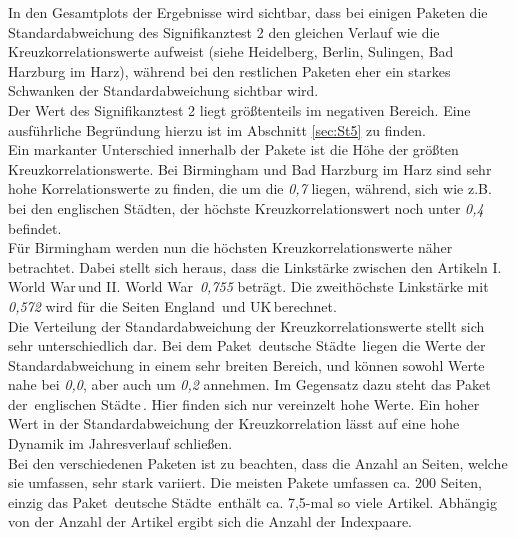 \documentclass[fontsize=11pt, twoside, a4paper]{scrartcl}
\begin{document}
In den Gesamtplots der Ergebnisse wird sichtbar, dass bei einigen Paketen die Standardabweichung des Signifikanztest 2 den gleichen Verlauf wie die Kreuzkorrelationswerte aufweist (siehe Heidelberg, Berlin, Sulingen, Bad Harzburg im Harz), während bei den restlichen Paketen eher ein starkes Schwanken der Standardabweichung sichtbar wird.\\
Der Wert des Signifikanztest 2 liegt größtenteils im negativen Bereich. Eine ausführliche Begründung
hierzu ist im Abschnitt \ref{sec:St5} zu finden.\\
Ein markanter Unterschied innerhalb der Pakete ist die Höhe der größten Kreuzkorrelationswerte. Bei Birmingham und Bad Harzburg im Harz sind sehr hohe Korrelationswerte zu finden, die um die \textit{0,7} liegen, während, sich wie z.B. bei den englischen Städten, der höchste Kreuzkorrelationswert noch unter \textit{0,4} befindet.\\
Für Birmingham werden nun die höchsten Kreuzkorrelationswerte näher betrachtet. Dabei stellt sich heraus, dass die Linkstärke zwischen den Artikeln \glqq I. World War\grqq \,und \glqq II. World War\grqq \, \textit{0,755} beträgt. Die zweithöchste Linkstärke mit \textit{0,572} wird für die Seiten \glqq England\grqq\, und \glqq UK\grqq \,berechnet.\\
Die Verteilung der Standardabweichung der Kreuzkorrelationswerte stellt sich sehr unterschiedlich dar. Bei dem Paket \,\glqq deutsche Städte\grqq\, liegen die Werte der Standardabweichung in einem sehr breiten Bereich, und können sowohl Werte nahe bei \textit{0,0}, aber auch um \textit{0,2} annehmen. Im Gegensatz dazu steht das Paket der \,\glqq englischen Städte\grqq\,. Hier finden sich nur vereinzelt hohe Werte. Ein hoher Wert in der Standardabweichung der Kreuzkorrelation lässt auf eine hohe Dynamik im Jahresverlauf schließen.\\
Bei den verschiedenen Paketen ist zu beachten, dass die Anzahl an Seiten, welche sie umfassen, sehr stark variiert. Die meisten Pakete umfassen ca. 200 Seiten, einzig das Paket \,\glqq deutsche Städte\grqq\, enthält ca. 7,5-mal so viele Artikel. 
Abhängig von der Anzahl der Artikel ergibt sich die Anzahl der Indexpaare.
\end{document}
